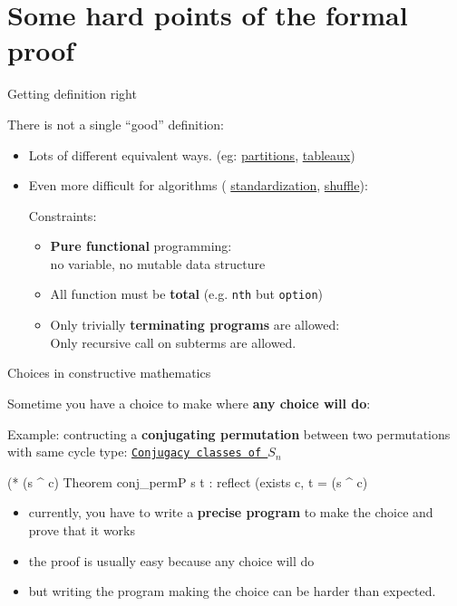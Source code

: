 \documentclass[compress,11pt]{beamer}
\begin{document}
\section{Some hard points of the formal proof}

\begin{frame}[fragile]{Getting definition right}

There is not a single ``good'' definition:
\bigskip

\begin{itemize}
\item Lots of different equivalent ways. (eg:
\href{file:html/Combi.Combi.partition.html#is_part}{partitions},
\href{file:html/Combi.Combi.tableau.html#is_tableau}{tableaux})
\bigskip\pause

\item Even more difficult for algorithms (
\href{file:html/Combi.Combi.std.html#std_rec}{standardization},
\href{file:html/Combi.LRrule.shuffle.html#shuffle_from_rec}{shuffle}):
  \medskip

  Constraints:
  \begin{itemize}
  \item \textbf{Pure functional} programming: \\
    no variable, no mutable data structure
    \bigskip
  \item All function must be \textbf{total} (e.g. \texttt{nth} but \texttt{option}) \\
    \bigskip
  \item Only trivially \textbf{terminating programs} are allowed:\\
    Only recursive call on subterms are allowed.

  \end{itemize}
\end{itemize}
\end{frame}

\begin{frame}[fragile]{Choices in constructive mathematics}

Sometime you have a choice to make where \textbf{any choice will do}:
\bigskip\pause

Example: contructing a \textbf{conjugating permutation} between two
permutations with same cycle type: {\tiny\hfill
  \href{file:html/Combi.SymGroup.cycletype.html#conj_permP}%
  {\texttt{Conjugacy classes of $S_n$}} \vspace{-2mm}}
\begin{coqcode}
(* (s ^ c)%
Theorem conj_permP s t :
  reflect (exists c, t = (s ^ c)%
\end{coqcode}
\begin{itemize}
\item currently, you have to write a \textbf{precise program} to make the
  choice and prove that it works
\item the proof is usually easy because any choice will do
\item but writing the program making the choice can be harder than expected.
\end{itemize}


\end{frame}
\end{document}

